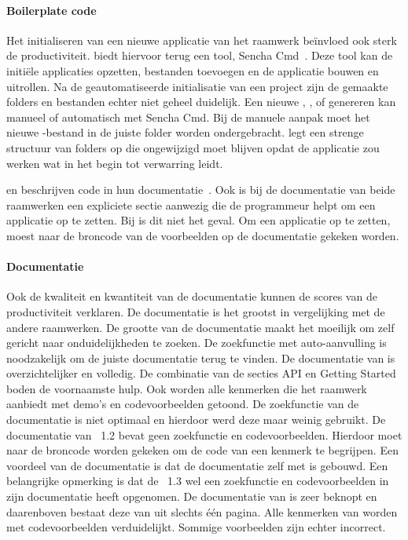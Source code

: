 \paragraph{Boilerplate code}
Het initialiseren van een nieuwe applicatie van het raamwerk beïnvloed ook sterk de productiviteit.
\st{} biedt hiervoor terug een tool,  Sencha Cmd~\cite{Sencha2012}.
Deze tool kan de initiële applicaties opzetten,  bestanden toevoegen en de applicatie bouwen en uitrollen.
Na de geautomatiseerde initialisatie van een project zijn de gemaakte folders en bestanden echter niet geheel duidelijk.
Een nieuwe ,  ,   of  genereren kan manueel of automatisch met Sencha Cmd.
Bij de manuele aanpak moet het nieuwe \js-bestand in de juiste folder worden ondergebracht.
\st{} legt een strenge structuur van folders op die ongewijzigd moet blijven opdat de applicatie zou werken wat in het begin tot verwarring leidt.

\jqm{} en \kendo{} beschrijven code in hun documentatie~\cite{JQuery2012b,Telerikd}.
Ook is bij de documentatie van beide raamwerken een expliciete sectie aanwezig die de programmeur helpt om een applicatie op te zetten.
Bij \lungo{} is dit niet het geval.  
Om een \lungo{} applicatie op te zetten, moest naar de broncode van de voorbeelden op de documentatie gekeken worden.

\paragraph{Documentatie}
Ook de kwaliteit en kwantiteit van de documentatie kunnen de scores van de productiviteit verklaren.
De \st{} documentatie is het grootst in vergelijking met de andere raamwerken.
De grootte van de documentatie maakt het moeilijk om zelf gericht naar onduidelijkheden te zoeken.
De zoekfunctie met auto-aanvulling is noodzakelijk om de juiste documentatie terug te vinden.
De documentatie van \kendo{} is overzichtelijker en volledig.
De combinatie van de secties API en Getting Started boden de voornaamste hulp.
Ook worden alle kenmerken die het raamwerk aanbiedt met demo's en codevoorbeelden getoond.
De zoekfunctie van de documentatie is niet optimaal en hierdoor werd deze maar weinig gebruikt.
De documentatie van \jqm{}~1.2 bevat geen zoekfunctie en codevoorbeelden.
Hierdoor moet naar de broncode worden gekeken om de code van een kenmerk te begrijpen.
Een voordeel van de \jqm{} documentatie is dat de documentatie zelf met \jqm{} is gebouwd.
Een belangrijke opmerking is dat de \jqm{}~1.3 wel een zoekfunctie en codevoorbeelden in zijn documentatie heeft opgenomen.
De documentatie van \lungo{} is zeer beknopt en daarenboven bestaat deze van \quo{} uit slechts één pagina.
Alle kenmerken van \lungo{} worden met codevoorbeelden verduidelijkt.
Sommige voorbeelden zijn echter incorrect.

